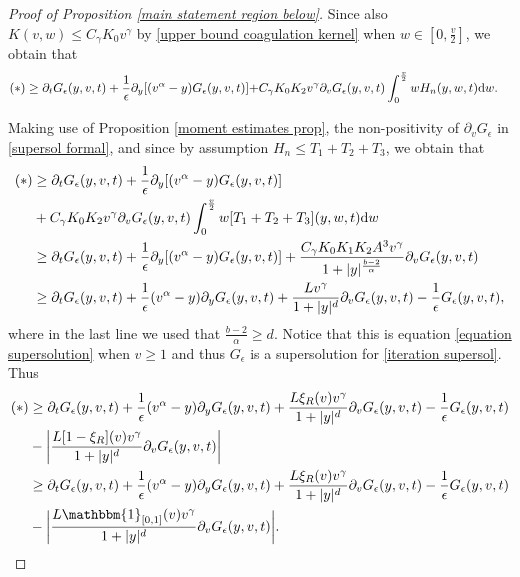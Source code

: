 \documentclass[11pt]{article}
\numberwithin{equation}{section}
\newcommand{\der}{\textup{d}}
\begin{document}
\begin{proof}[Proof of Proposition \ref{main statement region below}]
Since also $K(v,w)\leq C_{\gamma}K_{0}v^{\gamma}$ by \eqref{upper bound coagulation kernel} when $w\in[0,\frac{v}{2}]$, we obtain that
\begin{align}\label{supersol formal}
    (\ast)\geq\partial_{t}G_{\epsilon}(y,v,t)+\frac{1}{\epsilon}\partial_{y}[(v^{\alpha}-y)G_{\epsilon}(y,v,t)]+&C_{\gamma}K_{0}K_{2}v^{\gamma}\partial_{v}G_{\epsilon}(y,v,t)\int_{0}^{\frac{v}{2}}w H_{n}(y,w,t)\der w.
\end{align}


Making use of Proposition \ref{moment estimates prop}, the non-positivity of $\partial_{v}G_{\epsilon}$ in \eqref{supersol formal}, and since by assumption $H_{n}\leq T_{1}+T_{2}+T_{3}$, we obtain that
\begin{align*}
    (\ast)&\geq\partial_{t}G_{\epsilon}(y,v,t)+\frac{1}{\epsilon}\partial_{y}[(v^{\alpha}-y)G_{\epsilon}(y,v,t)]\\
    &+C_{\gamma}K_{0}K_{2}v^{\gamma}\partial_{v}G_{\epsilon}(y,v,t)\int_{0}^{\frac{v}{2}}w [T_{1}+T_{2}+T_{3}](y,w,t)\der w\\
    &\geq \partial_{t}G_{\epsilon}(y,v,t)+\frac{1}{\epsilon}\partial_{y}[(v^{\alpha}-y)G_{\epsilon}(y,v,t)]+\frac{C_{\gamma}K_{0}K_{1}K_{2}A^{3}v^{\gamma}}{1+|y|^{\frac{b-2}{\alpha}}}\partial_{v}G_{\epsilon}(y,v,t)\\
    &\geq\partial_{t}G_{\epsilon}(y,v,t)+\frac{1}{\epsilon}(v^{\alpha}-y)\partial_{y}G_{\epsilon}(y,v,t)+\frac{Lv^{\gamma}}{1+|y|^{d}}\partial_{v}G_{\epsilon}(y,v,t)-\frac{1}{\epsilon}G_{\epsilon}(y,v,t),
\end{align*}
where in the last line we used that $\frac{b-2}{\alpha}\geq d$. Notice that this is equation \eqref{equation supersolution} when $v\geq 1$ and thus  $G_{\epsilon}$ is a supersolution for \eqref{iteration supersol}. Thus
\begin{align*}
    (\ast)
    &\geq \partial_{t}G_{\epsilon}(y,v,t)+\frac{1}{\epsilon}(v^{\alpha}-y)\partial_{y}G_{\epsilon}(y,v,t)+\frac{L\xi_{R}(v)v^{\gamma}}{1+|y|^{d}}\partial_{v}G_{\epsilon}(y,v,t)-\frac{1}{\epsilon}G_{\epsilon}(y,v,t)\\
    &-\bigg|\frac{L[1-\xi_{R}](v)v^{\gamma}}{1+|y|^{d}}\partial_{v}G_{\epsilon}(y,v,t)\bigg|\\
     &\geq \partial_{t}G_{\epsilon}(y,v,t)+\frac{1}{\epsilon}(v^{\alpha}-y)\partial_{y}G_{\epsilon}(y,v,t)+\frac{L\xi_{R}(v)v^{\gamma}}{1+|y|^{d}}\partial_{v}G_{\epsilon}(y,v,t)-\frac{1}{\epsilon}G_{\epsilon}(y,v,t)\\
    &-\bigg|\frac{L\mathbbm{1}_{[0,1]}(v)v^{\gamma}}{1+|y|^{d}}\partial_{v}G_{\epsilon}(y,v,t)\bigg|.

\end{align*}
\end{proof}
\end{document}
